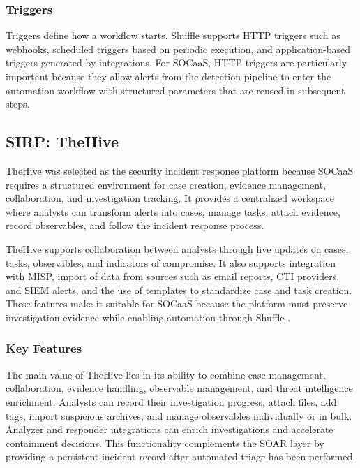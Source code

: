 \subsubsection{Triggers}

Triggers define how a workflow starts. Shuffle supports HTTP triggers such as webhooks, scheduled triggers based on periodic execution, and application-based triggers generated by integrations. For SOCaaS, HTTP triggers are particularly important because they allow alerts from the detection pipeline to enter the automation workflow with structured parameters that are reused in subsequent steps.

\subsection{SIRP: TheHive}
\label{subsec:thehive}

TheHive was selected as the security incident response platform because SOCaaS requires a structured environment for case creation, evidence management, collaboration, and investigation tracking. It provides a centralized workspace where analysts can transform alerts into cases, manage tasks, attach evidence, record observables, and follow the incident response process.

TheHive supports collaboration between analysts through live updates on cases, tasks, observables, and indicators of compromise. It also supports integration with MISP, import of data from sources such as email reports, CTI providers, and SIEM alerts, and the use of templates to standardize case and task creation. These features make it suitable for SOCaaS because the platform must preserve investigation evidence while enabling automation through Shuffle \cite{thehive-docs}.

\subsubsection{Key Features}

The main value of TheHive lies in its ability to combine case management, collaboration, evidence handling, observable management, and threat intelligence enrichment. Analysts can record their investigation progress, attach files, add tags, import suspicious archives, and manage observables individually or in bulk. Analyzer and responder integrations can enrich investigations and accelerate containment decisions. This functionality complements the SOAR layer by providing a persistent incident record after automated triage has been performed.

